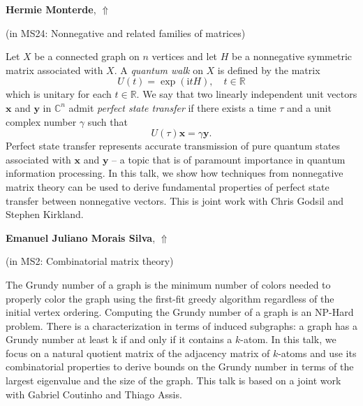 \documentclass[ILAS2025-program.tex]{subfiles}
\begin{document}
\hypertarget{down0351}{}\begin{ilasabstract}
    
\textbf{Hermie Monterde},  \hfill \hyperlink{up0351}{$\Uparrow$}
    
    
(in {\color{mstitle}MS24: Nonnegative and related families of matrices})
        
\mtskip
    Let $X$ be a connected graph on $n$ vertices and let $H$ be a nonnegative symmetric matrix associated with $X$. A \textit{quantum walk} on $X$ is defined by the matrix
\begin{equation*}
U(t)=\exp({\mathrm{i}tH}),\quad t\in\mathbb{R}
\end{equation*}
which is unitary for each $t\in\mathbb{R}$. We say that two linearly independent unit vectors $\mathbf{x}$ and $\mathbf{y}$ in $\mathbb{C}^n$ admit \textit{perfect state transfer} if there exists a time $\tau$ and a unit complex number $\gamma$ such that
\begin{equation*}
U(\tau)\mathbf{x}=\gamma\mathbf{y}.
\end{equation*}
Perfect state transfer represents accurate transmission of pure quantum states associated with $\mathbf{x}$ and $\mathbf{y}$ -- a topic that is of paramount importance in quantum information processing. In this talk, we show how techniques from nonnegative matrix theory can be used to derive fundamental properties of perfect state transfer between nonnegative vectors. This is joint work with Chris Godsil and Stephen Kirkland.

\end{ilasabstract}
    

\hypertarget{down0143}{}\begin{ilasabstract}
    
\textbf{Emanuel Juliano Morais Silva},  \hfill \hyperlink{up0143}{$\Uparrow$}
    
    
(in {\color{mstitle}MS2: Combinatorial matrix theory})
        
\mtskip
    The Grundy number of a graph is the minimum number of colors needed to properly color the graph using the first-fit greedy algorithm regardless of the initial vertex ordering. Computing the Grundy number of a graph is an NP-Hard problem. There is a characterization in terms of induced subgraphs: a graph has a Grundy number at least k if and only if it contains a $k$-atom. 
In this talk, we focus on a natural quotient matrix of the adjacency matrix of $k$-atoms and use its combinatorial properties to derive bounds on the Grundy number in terms of the largest eigenvalue and the size of the graph.
This talk is based on a joint work with Gabriel Coutinho and Thiago Assis.

\end{ilasabstract}
    
\end{document}
